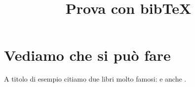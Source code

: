 \documentclass[a4paper,10pt]{article}
\title{Prova con bib\TeX}
\begin{document}
\maketitle

\newpage

\section{Vediamo che si può fare}
A titolo di esempio citiamo due libri molto famosi: \cite{Fey05} e anche \cite{Rudin87}.

\vspace{5cm}





\end{document}

